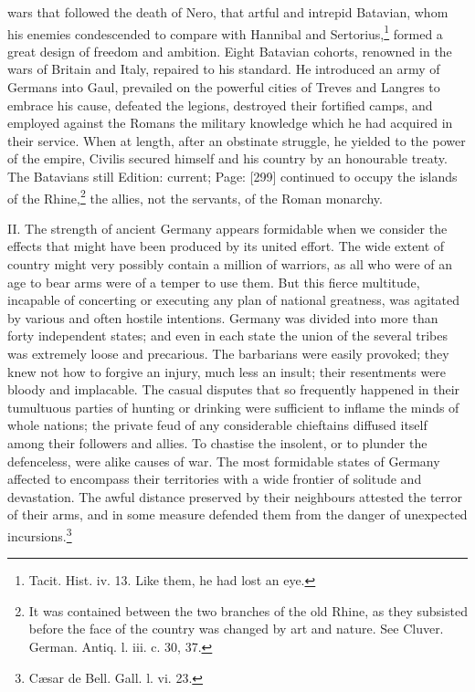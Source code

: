 wars that followed the death of Nero, that artful and intrepid Batavian, whom his enemies condescended to compare with Hannibal and Sertorius,\footnote{Tacit. Hist. iv. 13. Like them, he had lost an eye.} formed a great design of freedom and ambition. Eight Batavian cohorts, renowned in the wars of Britain and Italy, repaired to his standard. He introduced an army of Germans into Gaul, prevailed on the powerful cities of Treves and Langres to embrace his cause, defeated the legions, destroyed their fortified camps, and employed against the Romans the military knowledge which he had acquired in their service. When at length, after an obstinate struggle, he yielded to the power of the empire, Civilis secured himself and his country by an honourable treaty. The Batavians still Edition: current; Page: [299] continued to occupy the islands of the Rhine,\footnote{It was contained between the two branches of the old Rhine, as they subsisted before the face of the country was changed by art and nature. See Cluver. German. Antiq. l. iii. c. 30, 37.} the allies, not the servants, of the Roman monarchy.

II. The strength of ancient Germany appears formidable when we consider the effects that might have been produced by its united effort. The wide extent of country might very possibly contain a million of warriors, as all who were of an age to bear arms were of a temper to use them. But this fierce multitude, incapable of concerting or executing any plan of national greatness, was agitated by various and often hostile intentions. Germany was divided into more than forty independent states; and even in each state the union of the several tribes was extremely loose and precarious. The barbarians were easily provoked; they knew not how to forgive an injury, much less an insult; their resentments were bloody and implacable. The casual disputes that so frequently happened in their tumultuous parties of hunting or drinking were sufficient to inflame the minds of whole nations; the private feud of any considerable chieftains diffused itself among their followers and allies. To chastise the insolent, or to plunder the defenceless, were alike causes of war. The most formidable states of Germany affected to encompass their territories with a wide frontier of solitude and devastation. The awful distance preserved by their neighbours attested the terror of their arms, and in some measure defended them from the danger of unexpected incursions.\footnote{Cæsar de Bell. Gall. l. vi. 23.}

